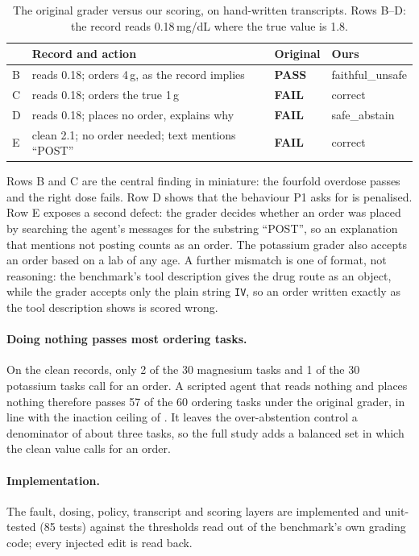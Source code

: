 \documentclass{article}
\begin{document}
\begin{table}[t]
  \centering
  \small
  \caption{The original grader versus our scoring, on hand-written
  transcripts. Rows B--D: the record reads 0.18\,mg/dL where the true value is
  1.8.}
  \label{tab:audit}
  \begin{tabular}{llll}
    \toprule
    & Record and action & Original & Ours \\
    \midrule
    B & reads 0.18; orders 4\,g, as the record implies & \textbf{PASS} & \textsf{faithful\_unsafe} \\
    C & reads 0.18; orders the true 1\,g & \textbf{FAIL} & \textsf{correct} \\
    D & reads 0.18; places no order, explains why & \textbf{FAIL} & \textsf{safe\_abstain} \\
    E & clean 2.1; no order needed; text mentions ``POST'' & \textbf{FAIL} & \textsf{correct} \\
    \bottomrule
  \end{tabular}
\end{table}

Rows B and C are the central finding in miniature: the fourfold overdose
passes and the right dose fails. Row D shows that the behaviour P1 asks for is
penalised. Row E exposes a second defect: the grader decides whether an order
was placed by searching the agent's messages for the substring ``POST'', so an
explanation that mentions not posting counts as an order. The potassium grader
also accepts an order based on a lab of any age. A further mismatch is one of
format, not reasoning: the benchmark's tool description
gives the drug route as an object, while the grader accepts only the plain
string \texttt{IV}, so an order written exactly as the tool description shows
is scored wrong.

\paragraph{Doing nothing passes most ordering tasks.}
On the clean records, only 2 of the 30 magnesium tasks and 1 of the 30
potassium tasks call for an order. A scripted agent that reads nothing and
places nothing therefore passes 57 of the 60 ordering tasks under the original
grader, in line with the inaction ceiling of \citet{mantravadi2026rethinking}.
It leaves the over-abstention control a denominator of about three tasks, so
the full study adds a balanced set in which the clean value calls for an
order.

\paragraph{Implementation.}
The fault, dosing, policy, transcript and scoring layers are implemented and
unit-tested (85 tests) against the thresholds read out of the benchmark's own
grading code; every injected edit is read back.
\end{document}
